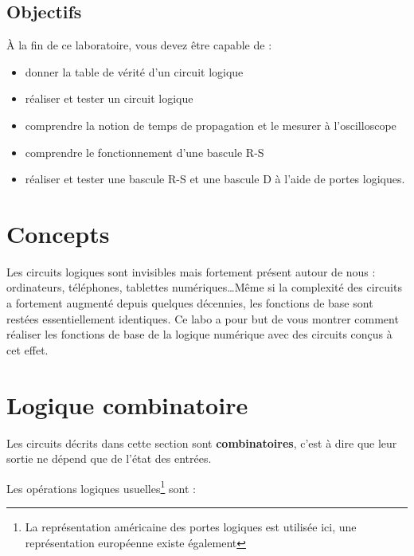 \documentclass[11pt,a4paper]{article}
\theoremstyle{definition}%
\newtheorem{Q}{Question}[] %
\newcommand{\reponse}[1]{%
	\ifthenelse {\boolean{corrige}} {\paragraph{Réponse :} \color{darkblue}   #1\color{black}} {}
 }
\begin{document}


\subsection{Objectifs}
À la fin de ce laboratoire, vous devez être capable de :
\begin{itemize}
\item donner la table de vérité d'un circuit logique
\item réaliser et tester un circuit logique
\item comprendre la notion de temps de propagation et le mesurer à l'oscilloscope
\item comprendre le fonctionnement d'une bascule R-S
\item réaliser et tester une bascule R-S et une bascule D à l'aide de portes logiques.
\end{itemize}
\newpage
\pagestyle{fancy}

\section{Concepts}

Les circuits logiques sont invisibles mais fortement présent autour de nous : ordinateurs, téléphones, tablettes numériques\dots Même si la complexité des circuits a fortement augmenté depuis quelques décennies, les fonctions de base sont restées essentiellement identiques. Ce labo a pour but de vous montrer comment réaliser les fonctions de base de la logique numérique avec des circuits conçus à cet effet.

\section{Logique combinatoire}

Les circuits décrits dans cette section sont \textbf{combinatoires}, c'est à dire que leur sortie ne dépend que de l'état des entrées.

Les opérations logiques usuelles\footnote{La représentation américaine des portes logiques est utilisée ici, une représentation européenne existe également} sont :
\end{document}
